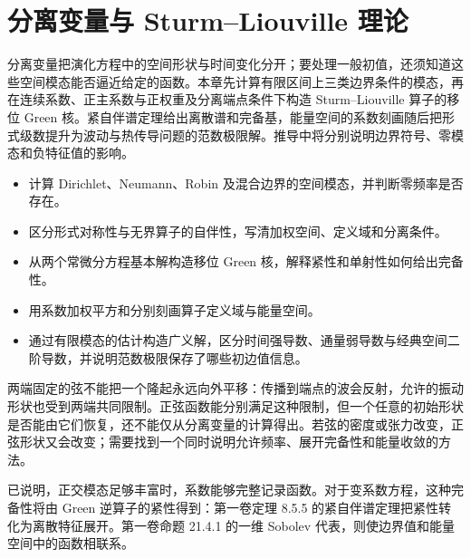 \chapter{分离变量与 Sturm–Liouville 理论}
\label{b2:ch:10}
\begin{chapterabstract}
分离变量把演化方程中的空间形状与时间变化分开；要处理一般初值，还须知道这些空间模态能否逼近给定的函数。本章先计算有限区间上三类边界条件的模态，再在连续系数、正主系数与正权重及分离端点条件下构造 Sturm--Liouville 算子的移位 Green 核。紧自伴谱定理给出离散谱和完备基，能量空间的系数刻画随后把形式级数提升为波动与热传导问题的范数极限解。推导中将分别说明边界符号、零模态和负特征值的影响。
\end{chapterabstract}

\begin{learninggoals}
\begin{itemize}
\item\label{b2:item:10-goal-modes}计算 Dirichlet、Neumann、Robin 及混合边界的空间模态，并判断零频率是否存在。
\item\label{b2:item:10-goal-domain}区分形式对称性与无界算子的自伴性，写清加权空间、定义域和分离条件。
\item\label{b2:item:10-goal-green}从两个常微分方程基本解构造移位 Green 核，解释紧性和单射性如何给出完备性。
\item\label{b2:item:10-goal-energy}用系数加权平方和分别刻画算子定义域与能量空间。
\item\label{b2:item:10-goal-limit}通过有限模态的估计构造广义解，区分时间强导数、通量弱导数与经典空间二阶导数，并说明范数极限保存了哪些初边值信息。
\end{itemize}
\end{learninggoals}

两端固定的弦不能把一个隆起永远向外平移：传播到端点的波会反射，允许的振动形状也受到两端共同限制。正弦函数能分别满足这种限制，但一个任意的初始形状是否能由它们恢复，还不能仅从分离变量的计算得出。若弦的密度或张力改变，正弦形状又会改变；需要找到一个同时说明允许频率、展开完备性和能量收敛的方法。

\ProseParagraphBreak

已说明，正交模态足够丰富时，系数能够完整记录函数。对于变系数方程，这种完备性将由 Green 逆算子的紧性得到：第一卷定理 8.5.5 的紧自伴谱定理把紧性转化为离散特征展开。第一卷命题 21.4.1 的一维 Sobolev 代表，则使边界值和能量空间中的函数相联系。

\ProseParagraphBreak

